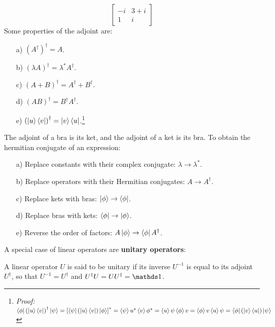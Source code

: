 \begin{itemize}
\begin{equation}
\begin{bmatrix}
            -i & 3 + i \\
            1 & i
        \end{bmatrix}
    \end{equation}
    Some properties of the adjoint are:
    \begin{enumerate}
        \item[a)] $\left(A^\dagger\right)^\dagger = A$.
        \item[b)] $\left(\lambda A\right)^\dagger = \lambda^*A^\dagger$.
        \item[c)] $\left(A + B\right)^\dagger = A^\dagger + B^\dagger$.
        \item[d)] $\left(A B\right)^\dagger = B^\dagger A^\dagger$.
        \item [e)] $\left(\ket{u}\bra{v}\right)^\dagger = \ket{v}\bra{u}$.\footnote{\textit{Proof:} $\bra{\phi}\left(\ket{u}\bra{v}\right)^\dagger\ket{\psi} = \left[\bra{\psi}\left(\ket{u}\bra{v}\right)\ket{\phi}\right]^* = \braket{\psi}{u}^*\braket{v}{\phi}^* = \braket{u}{\psi}\braket{\phi}{v} = \braket{\phi}{v}\braket{u}{\psi} = \bra{\phi}\left(\ket{v}\bra{u}\right)\ket{\psi}$}
    \end{enumerate}
    The adjoint of a bra is its ket, and the adjoint of a ket is its bra.
    To obtain the hermitian conjugate of an expression:
    \begin{enumerate}
        \item[a)] Replace constants with their complex conjugate: $\lambda \to \lambda^*$.
        \item[b)] Replace operators with their Hermitian conjugates: $A\to A^\dagger$.
        \item[c)] Replace kets with bras: $\ket{\phi}\to\bra{\phi}$.
        \item[d)] Replace bras with kets: $\bra{\phi}\to\ket{\phi}$.
        \item[e)] Reverse the order of factors: $A\ket{\phi} \to \bra{\phi}A^\dagger$.

    \end{enumerate}
\end{itemize}

A special case of linear operators are \textbf{unitary operators}:

\begin{definition}
    A linear operator $U$ is said to be unitary if its inverse $U^{-1}$ is equal to its adjoint $U^\dagger$, so that $U^{-1} = U^\dagger$ and $U^\dagger U = UU^\dagger = \Imat$.
\end{definition}

